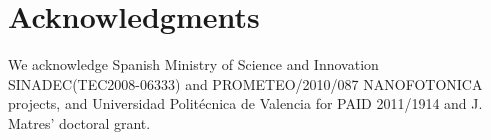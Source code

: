 \documentclass[10pt,letterpaper]{article}
\begin{document}


\section*{Acknowledgments}
We acknowledge Spanish Ministry of Science and Innovation SINADEC(TEC2008-06333) and PROMETEO/2010/087 NANOFOTONICA projects, and Universidad Polit\'ecnica de Valencia for PAID 2011/1914 and J. Matres' doctoral grant.


\end{document}
